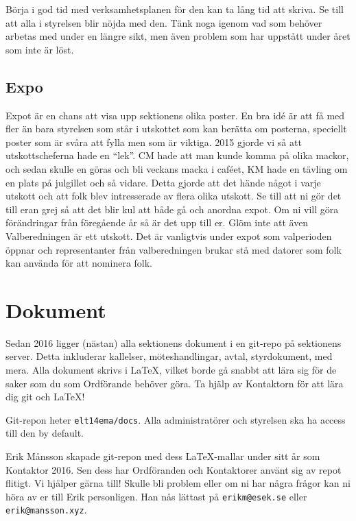 \documentclass[10pt]{article}
\begin{document}
    Börja i god tid med verksamhetsplanen för den kan ta lång tid att skriva. Se till att alla i styrelsen blir nöjda med den. Tänk noga igenom vad som behöver arbetas med under en längre sikt, men även problem som har uppstått under året som inte är löst.
    
    \subsection{Expo}
    
    Expot är en chans att visa upp sektionens olika poster. En bra idé är att få med fler än bara styrelsen som står i utskottet som kan berätta om posterna, speciellt poster som är svåra att fylla men som är viktiga. 2015 gjorde vi så att utskottscheferna hade en ``lek''. CM hade att man kunde komma på olika mackor, och sedan skulle en göras och bli veckans macka i caféet, KM hade en tävling om en plats på julgillet och så vidare. Detta gjorde att det hände något i varje utskott och att folk blev intresserade av flera olika utskott. Se till att ni gör det till eran grej så att det blir kul att både gå och anordna expot. Om ni vill göra förändringar från föregående år så är det upp till er. Glöm inte att även Valberedningen är ett utskott. Det är vanligtvis under expot som valperioden öppnar och representanter från valberedningen brukar stå med datorer som folk kan använda för att nominera folk.
    
    \section{Dokument}
    
    Sedan 2016 ligger (nästan) alla sektionens dokument i en git-repo på sektionens server. Detta inkluderar kallelser, möteshandlingar, avtal, styrdokument, med mera. Alla dokument skrivs i \LaTeX, vilket borde gå snabbt att lära sig för de saker som du som Ordförande behöver göra. Ta hjälp av Kontaktorn för att lära dig git och \LaTeX!
    
    Git-repon heter \texttt{elt14ema/docs}. Alla administratörer och styrelsen ska ha access till den by default.
    
    Erik Månsson skapade git-repon med dess \LaTeX-mallar under sitt år som Kontaktor 2016. Sen dess har Ordföranden och Kontaktorer använt sig av repot flitigt. Vi hjälper gärna till! Skulle bli problem eller om ni har några frågor kan ni höra av er till Erik personligen. Han nås lättast på \texttt{erikm@esek.se} eller \texttt{erik@mansson.xyz}.
    
\end{document}
